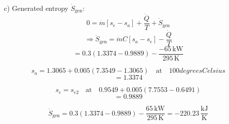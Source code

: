 c) Generated entropy \( \dot{S}_{\text{gen}} \):
\[
0 = \dot{m} [s_e - s_a] + \frac{\dot{Q}}{T} + \dot{S}_{\text{gen}}
\]
\[
\Rightarrow \dot{S}_{\text{gen}} = \dot{m} C [s_a - s_e] - \frac{\dot{Q}}{T}
\]
\[
= 0.3 (1.3374 - 0.9889) - \frac{-65 \, \text{kW}}{295 \, \text{K}}
\]

\[
s_a = 1.3065 + 0.005 (7.3549 - 1.3065) \quad \text{at} \quad 100 degrees Celsius
\]
\[
= 1.3374
\]

\[
s_e = s_{e2} \quad \text{at} \quad 0.9549 + 0.005 (7.7553 - 0.6491)
\]
\[
= 0.9889
\]

\[
\dot{S}_{\text{gen}} = 0.3 (1.3374 - 0.9889) - \frac{65 \, \text{kW}}{295 \, \text{K}} = -220.23 \, \frac{\text{kJ}}{\text{K}}
\]